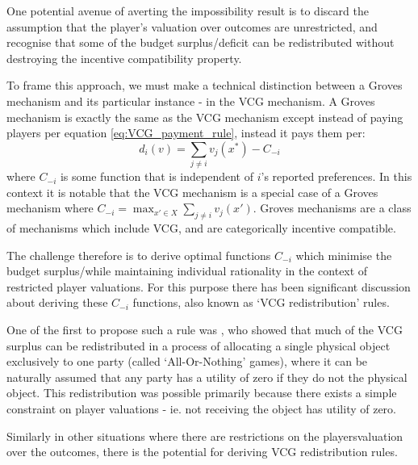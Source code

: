 One potential avenue of averting the impossibility result is to discard the assumption that the player's valuation over outcomes are unrestricted, and recognise that some of the budget surplus/deficit can be redistributed without destroying the incentive compatibility property.

To frame this approach, we must make a technical distinction between a Groves mechanism and its particular instance - in the VCG mechanism.
A Groves mechanism is exactly the same as the VCG mechanism except instead of paying players per equation \ref{eq:VCG_payment_rule}, instead it pays them per:
\begin{equation}\label{eq:Groves_payment_equation} d_i(v)=\sum_{j\ne i}v_j(x^*) - C_{-i} \end{equation}
where $C_{-i}$ is some function that is independent of $i$'s reported preferences.
In this context it is notable that the VCG mechanism is a special case of a Groves mechanism \citep{10.2307/1914085} where $C_{-i}= \max_{x'\in X}\sum_{j\ne i}v_j(x')$.
Groves mechanisms are a class of mechanisms which include VCG, and are categorically incentive compatible. 

The challenge therefore is to derive optimal functions $C_{-i}$ which minimise the budget surplus/\DIFdelbegin {}\DIFdelend \DIFaddbegin {}\DIFaddend while maintaining individual rationality in the context of restricted player valuations.
For this purpose there has been significant discussion about deriving these $C_{-i}$ functions, also known as `VCG redistribution' rules.

One of the first to propose such a rule was \cite{Cavallo:2006:ODM:1160633.1160790}, who showed that much of the VCG surplus can be redistributed in a process of allocating a single physical object exclusively to one party (called `All-Or-Nothing' games), where it can be naturally assumed that any party has a utility of zero if they do not \DIFdelbegin {}\DIFdelend \DIFaddbegin {}\DIFaddend the physical object.
This redistribution was possible primarily because there exists a simple constraint on player valuations - ie. not receiving the object has utility of zero.
\DIFdelbegin %

\DIFdelend Similarly in other situations where there are restrictions on the players\DIFaddbegin {}\DIFaddend valuation over the outcomes, there is the potential for deriving \DIFaddbegin {}\DIFaddend VCG redistribution rules.

